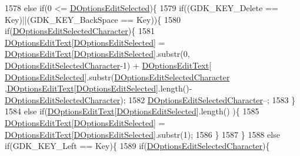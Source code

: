 \begin{DoxyCode}
1578         \textcolor{keywordflow}{else} \textcolor{keywordflow}{if}(0 <= \hyperlink{classCApplicationData_aee4aa5eb5b89b86eb2648d0f9c7358f9}{DOptionsEditSelected})\{
1579             \textcolor{keywordflow}{if}((GDK\_KEY\_Delete == Key)||(GDK\_KEY\_BackSpace == Key))\{
1580                 \textcolor{keywordflow}{if}(\hyperlink{classCApplicationData_a921d69021fc61e51d12d8a26a5ac1a89}{DOptionsEditSelectedCharacter})\{
1581                     \hyperlink{classCApplicationData_a7044dc34cbd9d6776e8ef79eb12b5ce4}{DOptionsEditText}[\hyperlink{classCApplicationData_aee4aa5eb5b89b86eb2648d0f9c7358f9}{DOptionsEditSelected}] = 
      \hyperlink{classCApplicationData_a7044dc34cbd9d6776e8ef79eb12b5ce4}{DOptionsEditText}[\hyperlink{classCApplicationData_aee4aa5eb5b89b86eb2648d0f9c7358f9}{DOptionsEditSelected}].substr(0,
      \hyperlink{classCApplicationData_a921d69021fc61e51d12d8a26a5ac1a89}{DOptionsEditSelectedCharacter}-1) + \hyperlink{classCApplicationData_a7044dc34cbd9d6776e8ef79eb12b5ce4}{DOptionsEditText}[
      \hyperlink{classCApplicationData_aee4aa5eb5b89b86eb2648d0f9c7358f9}{DOptionsEditSelected}].substr(\hyperlink{classCApplicationData_a921d69021fc61e51d12d8a26a5ac1a89}{DOptionsEditSelectedCharacter}
      ,\hyperlink{classCApplicationData_a7044dc34cbd9d6776e8ef79eb12b5ce4}{DOptionsEditText}[\hyperlink{classCApplicationData_aee4aa5eb5b89b86eb2648d0f9c7358f9}{DOptionsEditSelected}].length()-
      \hyperlink{classCApplicationData_a921d69021fc61e51d12d8a26a5ac1a89}{DOptionsEditSelectedCharacter});
1582                     \hyperlink{classCApplicationData_a921d69021fc61e51d12d8a26a5ac1a89}{DOptionsEditSelectedCharacter}--;
1583                 \}
1584                 \textcolor{keywordflow}{else} \textcolor{keywordflow}{if}(\hyperlink{classCApplicationData_a7044dc34cbd9d6776e8ef79eb12b5ce4}{DOptionsEditText}[\hyperlink{classCApplicationData_aee4aa5eb5b89b86eb2648d0f9c7358f9}{DOptionsEditSelected}].length()
      )\{
1585                     \hyperlink{classCApplicationData_a7044dc34cbd9d6776e8ef79eb12b5ce4}{DOptionsEditText}[\hyperlink{classCApplicationData_aee4aa5eb5b89b86eb2648d0f9c7358f9}{DOptionsEditSelected}] = 
      \hyperlink{classCApplicationData_a7044dc34cbd9d6776e8ef79eb12b5ce4}{DOptionsEditText}[\hyperlink{classCApplicationData_aee4aa5eb5b89b86eb2648d0f9c7358f9}{DOptionsEditSelected}].substr(1);
1586                 \}
1587             \}
1588             \textcolor{keywordflow}{else} \textcolor{keywordflow}{if}(GDK\_KEY\_Left == Key)\{
1589                 \textcolor{keywordflow}{if}(\hyperlink{classCApplicationData_a921d69021fc61e51d12d8a26a5ac1a89}{DOptionsEditSelectedCharacter})\{

\end{DoxyCode}
